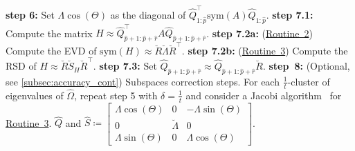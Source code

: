 \documentclass[10pt,twoside,dvipsnames]{siamart1116}
\numberwithin{algorithm}{section}
\numberwithin{equation}{section}
\newcommand{\wordref}[2]{\hyperlink{#1}{#2}}
\begin{document}
\begin{algorithm}
\begin{algorithmic}
		\ENDFOR
		\STATE \textbf{step 6:} Set $\Lambda\cos(\Theta)$ as the diagonal of $\widehat{Q}_{1:\widehat{p}}^\top  \mathrm{sym}(A) \widehat{Q}_{1:\widehat{p}}$.
		\STATE \textbf{step 7.1:} Compute the matrix $H\approx \widehat{Q}_{\widehat{p}+1:\widehat{p}+\widehat{r}}^\top A\widehat{Q}_{\widehat{p}+1:\widehat{p}+\widehat{r}}$. 
		\STATE \textbf{step 7.2a:} (\wordref{oracle2}{Routine~2}) Compute the EVD of $\mathrm{sym}(H)\approx\breve{R}\breve{\Lambda} \breve{R}^\top $.
		\ELSE
			\STATE \textbf{step 7.2b:} (\wordref{oracle3}{Routine~3}) Compute the RSD of $H\approx \breve{R}\breve{S}_H \breve{R}^\top $.
		\ENDIF
		\STATE \textbf{step 7.3:} Set $\widehat{Q}_{\widehat{p}+1:\widehat{p}+\widehat{r}}\approx \widehat{Q}_{\widehat{p}+1:\widehat{p}+\widehat{r}} \breve{R}$.
		\ENDIF
		\STATE \textbf{step~8:} (Optional, see \cref{subsec:accuracy_cont}) Subspaces correction steps. For each $\frac{1}{t}$-cluster of eigenvalues of $\widehat{\Omega}$, repeat step 5 with $\delta=\frac{1}{t}$ and consider a Jacobi algorithm~\cite{ZhouBrent03} for \wordref{oracle3}{Routine~3}.
		\RETURN $\widehat{Q}$ and $\widehat{S}\coloneq \left[\begin{smallmatrix}
		\Lambda \cos(\Theta)&0&-\Lambda\sin(\Theta)\\
		0&\breve{\Lambda}&0\\
	\Lambda\sin(\Theta)&0 &\Lambda \cos(\Theta)
		\end{smallmatrix}\right]$.
	\end{algorithmic}%
	\end{algorithm}
\end{document}
